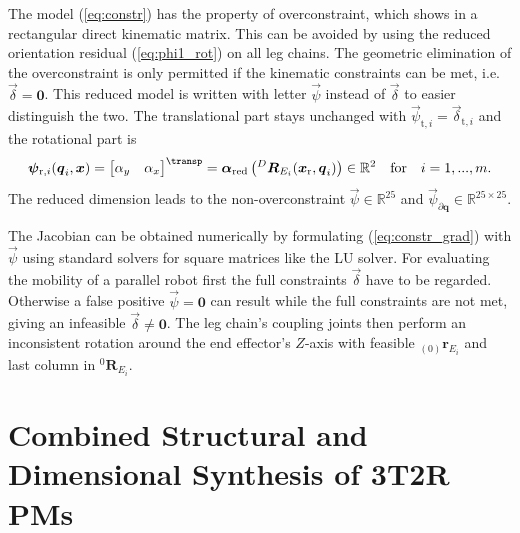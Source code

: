\documentclass[
	graybox,
	vecphys] %
	{svmult}
\newcommand{\bm}[1]{\boldsymbol{#1}}
\newcommand{\ortvek}[4]{{ }_{(#1)}{\boldsymbol{#2}}^{#3}_{#4} }
\newcommand{\vek}[3]{\boldsymbol{#1}^{#2}_{#3}}
\newcommand{\trmat}[2]{{{ }^{#1}\boldsymbol{T}}_{#2}}
\newcommand{\rotmat}[2]{{{ }^{#1}\boldsymbol{R}}_{#2}}
\newcommand{\Res}[0]{\vec{\delta}}
\newcommand{\ResR}[0]{\vec{\psi}}
\begin{document}
The model (\ref{eq:constr}) has the property of overconstraint, which shows in a rectangular direct kinematic matrix.
This can be avoided by using the reduced orientation residual (\ref{eq:phi1_rot}) on all leg chains.
The geometric elimination of the overconstraint is only permitted if the kinematic constraints can be met, i.e. $\Res{=}\bm{0}$.
This reduced model is written with letter $\ResR$ instead of $\Res$ to easier distinguish the two.
The translational part stays unchanged with $\ResR_{\mathrm{t},i}=\Res_{\mathrm{t},i}$  and the rotational part is
\vspace{-0.1cm}
\begin{equation}
\ResR_{\mathrm{r},i}(\bm{q}_i,\bm{x})
=
\begin{bmatrix}
\alpha_y & \alpha_x
\end{bmatrix}^\transp
=
\bm{\alpha}_\mathrm{red}\left(\rotmat{D}{E_i}(\bm{x}_{\mathrm{r}},\bm{q}_i)\right) \in \mathbb{R}^2
\quad \mathrm{for} \quad i=1,...,m.
\label{eq:constr_rot_red}
\end{equation}
\vspace{-0.1cm}
The reduced dimension leads to the non-overconstraint $\ResR \in \mathbb{R}^{25}$ and $\ResR_{\partial \bm{q}} \in \mathbb{R}^{25 \times 25}$. %

The Jacobian can be obtained numerically by formulating (\ref{eq:constr_grad}) with $\ResR$ using standard solvers for square matrices like the LU solver.
%
For evaluating the mobility of a parallel robot first the full constraints $\Res$ have to be regarded.
Otherwise a false positive $\ResR{=}\bm{0}$ can result while the full constraints are not met, giving an infeasible $\Res{\ne}\bm{0}$. %
The leg chain's coupling joints then perform an inconsistent rotation around the end effector's $Z$-axis with feasible $\ortvek{0}{r}{}{E_i}$ and last column in $\rotmat{0}{E_i}$.

\section{Combined Structural and Dimensional Synthesis of 3T2R PMs}
\label{sec:synthesis}
\end{document}
